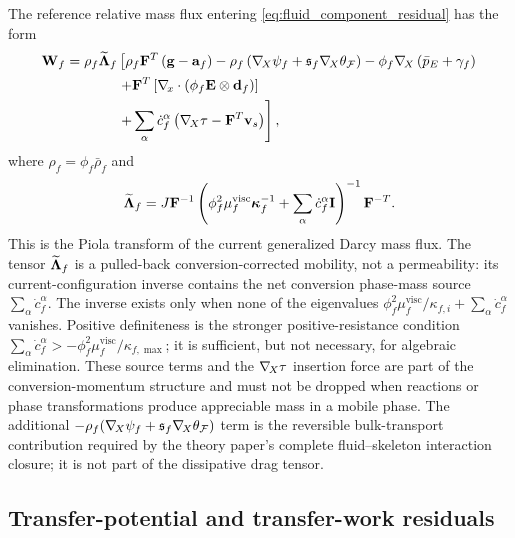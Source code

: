 The reference relative mass flux entering
\eqref{eq:fluid_component_residual} has the form
\begin{align}
	\mbf W_f
	= & \;
	\rho_f\widetilde{\bs\Lambda}_f
	\left[
		\rho_f\mbf F^T\left(\mbf g-\mbf a_f\right)
		-\rho_f
		\left(
			\Grad\psi_f
			+
			\mathfrak{s}_f\Grad\theta_{\mc F}
		\right)
		-\phi_f\Grad
		\left(
			\bar p_E+\gamma_f
		\right)
		\right.
		\notag \\
	& \phantom{\;\rho_f\widetilde{\bs\Lambda}_f}
		\left.
		+
		\mbf F^T
		\left[
			\grad\cdot
			\left(
				\phi_f\mbf E\otimes\mbf d_f
				\right)
		\right]
		\right.
		\notag \\
	& \phantom{\;\rho_f\widetilde{\bs\Lambda}_f}
		\left.
		+
		\sum_\alpha\dot c_f^\alpha
		\left(
			\Grad \tau
			-\mbf F^T\mbf v_s
		\right)
	\right],
	\label{eq:reference_flux_closure}
\end{align}
where \(\rho_f=\phi_f\bar\rho_f\) and
\begin{equation}
	\widetilde{\boldsymbol{\Lambda}}_f
	=
	J\mathbf{F}^{-1}
	\left(
			\phi_f^2\mu_f^{\mathrm{visc}}\boldsymbol{\kappa}_f^{-1}
		+\sum_\alpha\dot c_f^\alpha\mathbf{I}
	\right)^{-1}
	\mathbf{F}^{-T}.
	\label{eq:reference_modified_permeability}
\end{equation}
This is the Piola transform of the current generalized Darcy mass flux.  The
tensor \(\widetilde{\boldsymbol{\Lambda}}_f\) is a pulled-back
conversion-corrected mobility, not a permeability: its current-configuration
inverse contains the net conversion phase-mass source
\(\sum_\alpha\dot c_f^\alpha\).  The inverse exists only when none of the
eigenvalues
	\(\phi_f^2\mu_f^{\mathrm{visc}}/\kappa_{f,i}+\sum_\alpha\dot c_f^\alpha\) vanishes.
Positive definiteness is the stronger positive-resistance condition
\(\sum_\alpha\dot c_f^\alpha>
	-\phi_f^2\mu_f^{\mathrm{visc}}/\kappa_{f,\max}\); it is sufficient, but not necessary, for
algebraic elimination.  These source terms and the \(\nabla_{\!X}\tau\) insertion
force are part of the conversion-momentum structure and must not be dropped
when reactions or phase transformations produce appreciable mass in a mobile
phase.  The additional
\(-\rho_f(\nabla_{\!X}\psi_f+\mathfrak{s}_f\nabla_{\!X}\theta_{\mathcal{F}})\) term is the
reversible bulk-transport contribution required by the theory paper's complete
fluid--skeleton interaction closure; it is not part of the dissipative drag
tensor.

\subsection{Transfer-potential and transfer-work residuals}
\label{sec:conversion_potential_weak_form}

